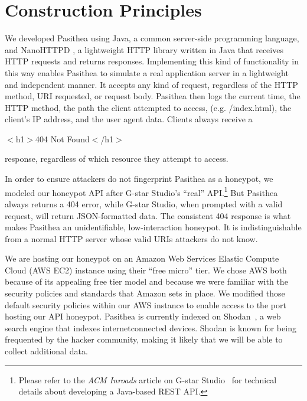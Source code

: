 
\section{Construction Principles} \label{construction}

We developed Pasithea using Java, a common server-side programming language, and NanoHTTPD \cite{Nanohttpd}, a lightweight HTTP library written in Java that receives HTTP requests and returns responses.
Implementing this kind of functionality in this way enables Pasithea to simulate a real application server in a lightweight and independent manner. 
It accepts any kind of request, regardless of the HTTP method, URI requested, or request body. 
Pasithea then logs the current time, the HTTP method, the path the client attempted to access, (e.g. /index.html), the client's IP address, and the user agent data. 
Clients always receive a
 

\begin{center}
$<$h1$>$404 Not Found$<$/h1$>$ 
\end{center}

\noindent
response, regardless of which resource they attempt to access.

In order to ensure attackers do not fingerprint Pasithea as a honeypot, we modeled our honeypot API after G-star Studio's ``real'' API.\footnote{
Please refer to the {\em ACM Inroads} article on G-star Studio~\cite{inroads-Labouseur16} for technical details about developing a Java-based REST API.
} 
But Pasithea always returns a 404 error, while G-star Studio, when prompted with a valid request, will return JSON-formatted data. 
The consistent 404 response is what makes Pasithea an unidentifiable, low-interaction honeypot. 
It is indistinguishable from a normal HTTP server whose valid URIs attackers do not know. 

We are hosting our honeypot on an Amazon Web Services Elastic Compute Cloud (AWS EC2) instance using their ``free micro'' tier. 
We chose AWS both because of its appealing free tier model and because we were familiar with the security policies and standards that Amazon sets in place. 
We modified those default security policies within our AWS instance to enable access to the port hosting our API honeypot. 
Pasithea is currently indexed on Shodan~\cite{unsavoryChar}, a web search engine that indexes internetconnected devices.
Shodan is known for being frequented by the hacker community, making it likely that we will be able to collect additional data.
